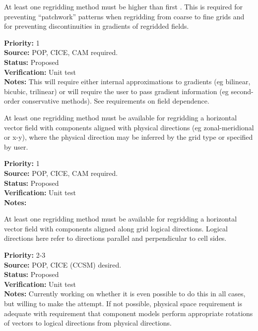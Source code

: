 
At least one regridding method must be higher than first
.  This is required for preventing
``patchwork'' patterns when regridding from coarse to fine
grids and for preventing discontinuities in gradients of
regridded fields.

\begin{reqlist}
{\bf Priority:} 1 \\
{\bf Source:}  POP, CICE, CAM required. \\
{\bf Status:} Proposed \\
{\bf Verification:} Unit test \\
{\bf Notes:} This will require either internal approximations to
             gradients (eg bilinear, bicubic, trilinear) or will require the 
             user to pass gradient information (eg second-order conservative 
             methods).  See requirements on field dependence.
\end{reqlist}


At least one regridding method must be available for regridding a horizontal
vector field with components aligned with physical directions 
(eg zonal-meridional or x-y), where the physical direction may be
inferred by the grid type or specified by user.

\begin{reqlist}
{\bf Priority:} 1 \\
{\bf Source:}  POP, CICE, CAM required. \\
{\bf Status:} Proposed \\
{\bf Verification:} Unit test \\
{\bf Notes:} 
\end{reqlist}


At least one regridding method must be available for regridding a horizontal
vector field with components aligned along grid logical directions.
Logical directions here refer to directions parallel and perpendicular
to cell sides.

\begin{reqlist}
{\bf Priority:} 2-3 \\
{\bf Source:}  POP, CICE (CCSM) desired. \\
{\bf Status:} Proposed \\
{\bf Verification:} Unit test \\
{\bf Notes:} Currently working on whether it is even possible to do this
             in all cases, but willing to make the attempt.  If not possible,
             physical space requirement is adequate with requirement that
             component models perform appropriate rotations of vectors to
             logical directions from physical directions.
\end{reqlist}

